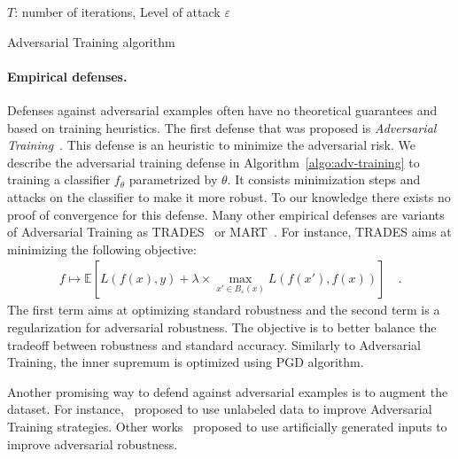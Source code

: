 \begin{algorithm}[h!]
  \SetAlgoLined
  $T$: number of iterations, Level of attack $\varepsilon$ \\
   \caption{Adversarial Training algorithm}
   \label{algo:advtraining}
\end{algorithm}
  

\paragraph{Empirical defenses.} Defenses against adversarial examples often have no theoretical guarantees and based on training heuristics. The first defense that was proposed is \emph{Adversarial Training}~\citep{goodfellow2014explaining,madry2017towards}. This defense is an heuristic to minimize the adversarial risk. We describe the adversarial training defense in Algorithm~\ref{algo:adv-training} to training a classifier $f_\theta$ parametrized by $\theta$. It consists minimization steps and attacks on the classifier to make it more robust. To our knowledge there exists no proof of convergence for this defense. Many other empirical defenses are variants of Adversarial Training as TRADES~\citep{zhang2019theoretically} or MART~\citep{wang2019improving}. For instance, TRADES aims at minimizing the following objective:
\begin{align*}
  f\mapsto\mathbb{E}\left[L(f(x),y)+\lambda\times\max_{x'\in B_\varepsilon(x)}L(f(x'),f(x))\right]\quad.
\end{align*}
The first term aims at optimizing standard robustness and the second term is a regularization for adversarial robustness. The objective is to better balance the tradeoff between robustness and standard accuracy. Similarly to Adversarial Training, the inner supremum is optimized using PGD algorithm.

Another promising way to defend against adversarial examples is to augment the dataset. For instance,~\cite{carmon2019unlabeled,rebuffi2021fixing} proposed to use unlabeled data to improve Adversarial Training strategies. Other works~\citep{wang2019improving,xxx} proposed to use artificially generated inputs to improve adversarial robustness. 




